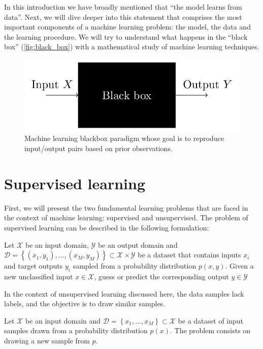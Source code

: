 In this introduction we have broadly mentioned that ``the model learns from data''. Next, we will dive deeper into this statement that comprises the most important components of a machine learning problem: the model, the data and the learning procedure.  We will try to understand what happens in the ``black box'' (\autoref{fig:black_box}) with a mathematical study of machine learning techniques.

\begin{figure}
    \centering
    \includegraphics[width=0.5\linewidth]{img/img-ch1/black_box.png}
    \caption{Machine learning blackbox paradigm whose goal is to reproduce input/output pairs based on prior observations.}
    \label{fig:black_box}
\end{figure}


\section{Supervised learning}
First, we  will present the two fundamental learning problems that are faced in the context of machine learning: supervised and unsupervised. The problem of supervised learning can be described in the following formulation:

\begin{definicion}
    Let $\mathcal{X}$ be an input domain, $\mathcal{Y}$ be an output domain and $\mathcal{D} = \left\lbrace (x_1,y_1),...,(x_M,y_M)\right\rbrace \subset \mathcal{X} \times \mathcal{Y}$ be a dataset that contains inputs $x_i$ and target outputs $y_i$ sampled from a probability distribution $p(x,y)$. Given a new unclassified input $x \in \mathcal{X}$, guess or predict the corresponding output $y \in \mathcal{Y}$
\end{definicion}

In the context of unsupervised learning discussed here, the data samples lack labels, and the objective is to draw similar samples.

\begin{definicion}
    Let $\mathcal{X}$ be an input domain and $\mathcal{D}=\left\lbrace x_1, ..., x_M\right \rbrace \subset \mathcal{X}$ be a dataset of input samples drawn from a probability distribution $p(x)$. The problem consists on drawing a new sample from $p$. 
\end{definicion}

